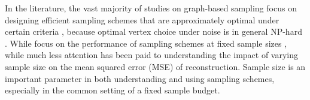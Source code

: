 In the literature, the vast majority of studies on graph-based sampling focus on designing efficient sampling schemes that are approximately optimal under certain criteria \cite[Chapter 6]{pukelsheim2006optimal}, because optimal vertex choice under noise is in general NP-hard \cite{nikolov2022proportional, chamon2017greedy}. While  focus on the performance of sampling schemes at fixed sample sizes \cite{xie2019bayesian, puy2018random,shomorony2014sampling, tremblay2017determinantal,wang2018optimal,wang2019low, bai2020fast,  anis2016efficient}, while much less attention has been paid to understanding the impact of varying sample size on the mean squared error (MSE) of reconstruction. Sample size is an important parameter in both understanding and using sampling schemes, especially in the common setting of a fixed sample budget. %

